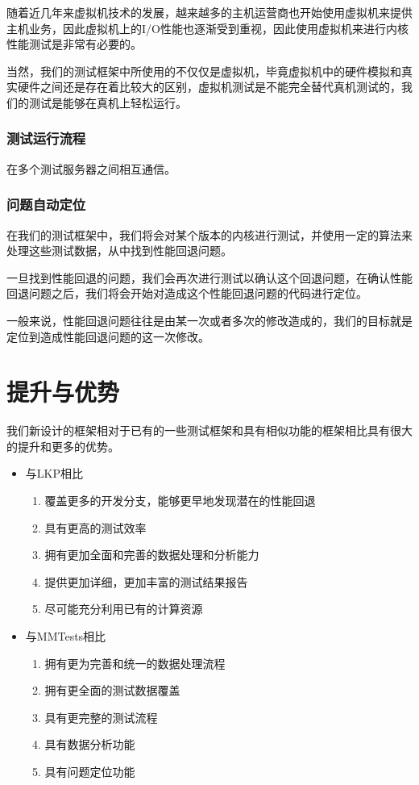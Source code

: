 随着近几年来虚拟机技术的发展，越来越多的主机运营商也开始使用虚拟机来提供主机业务，因此虚拟机上的I/O性能也逐渐受到重视，因此使用虚拟机来进行内核性能测试是非常有必要的。

当然，我们的测试框架中所使用的不仅仅是虚拟机，毕竟虚拟机中的硬件模拟和真实硬件之间还是存在着比较大的区别，虚拟机测试是不能完全替代真机测试的，我们的测试是能够在真机上轻松运行。



\subsubsection{测试运行流程}

在多个测试服务器之间相互通信。

\subsubsection{问题自动定位}
在我们的测试框架中，我们将会对某个版本的内核进行测试，并使用一定的算法来处理这些测试数据，从中找到性能回退问题。

一旦找到性能回退的问题，我们会再次进行测试以确认这个回退问题，在确认性能回退问题之后，我们将会开始对造成这个性能回退问题的代码进行定位。

一般来说，性能回退问题往往是由某一次或者多次的修改造成的，我们的目标就是定位到造成性能回退问题的这一次修改。



\section{提升与优势}

我们新设计的框架相对于已有的一些测试框架和具有相似功能的框架相比具有很大的提升和更多的优势。

\begin{itemize}
\item 与LKP相比

\begin{enumerate}
\item 覆盖更多的开发分支，能够更早地发现潜在的性能回退
\item 具有更高的测试效率
\item 拥有更加全面和完善的数据处理和分析能力
\item 提供更加详细，更加丰富的测试结果报告
\item 尽可能充分利用已有的计算资源
\end{enumerate}

\item 与MMTests相比

\begin{enumerate}
\item 拥有更为完善和统一的数据处理流程
\item 拥有更全面的测试数据覆盖
\item 具有更完整的测试流程
\item 具有数据分析功能
\item 具有问题定位功能
\end{enumerate}

\end{itemize}